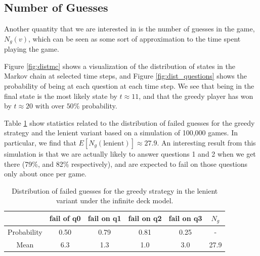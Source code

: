 \documentclass[12pt]{article}
\theoremstyle{definition}
\begin{document}
\subsection{Number of Guesses}
Another quantity that we are interested in is the number of guesses in the game, $N_g(v)$, which can be seen as some sort of approximation to the time spent playing the game.

Figure \ref{fig:distmc} shows a visualization of the distribution of states in the Markov chain at selected time steps, and Figure \ref{fig:dist_questions} shows the probability of being at each question at each time step. We see that being in the final state is the most likely state by $t \approx 11$, and that the greedy player has won by $t \approx 20$ with over $50\%$ probability.

Table \ref{fig:ngtable} show statistics related to the distribution of failed guesses for the greedy strategy and the lenient variant based on a simulation of 100,000 games. In particular, we find that $E[N_g(\text{lenient})] \approx 27.9$. An interesting result from this simulation is that we are actually likely to answer questions 1 and 2 when we get there (79\%, and 82\% respectively), and are expected to fail on those questions only about once per game.

\begin{table}[h]
    \begin{center}
        \begin{tabular}{@{}cccccc@{}}
        \toprule
                    & fail of q0 & fail on q1 & fail on q2 & fail on q3 & $N_g$ \\ \midrule
        Probability & 0.50        & 0.79       & 0.81       & 0.25       & -                 \\
        Mean        & 6.3        & 1.3        & 1.0        & 3.0          & 27.9          \\ \bottomrule
        \end{tabular}
        \caption{Distribution of failed guesses for the greedy strategy in the lenient variant under the infinite deck model.}
        \label{fig:ngtable}
        
    \end{center}
\end{table}
\end{document}
